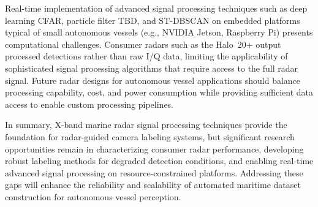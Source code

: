 Real-time implementation of advanced signal processing techniques such as deep learning CFAR, particle filter TBD, and ST-DBSCAN on embedded platforms typical of small autonomous vessels (e.g., NVIDIA Jetson, Raspberry Pi) presents computational challenges. Consumer radars such as the Halo~20+ output processed detections rather than raw I/Q data, limiting the applicability of sophisticated signal processing algorithms that require access to the full radar signal. Future radar designs for autonomous vessel applications should balance processing capability, cost, and power consumption while providing sufficient data access to enable custom processing pipelines.

In summary, X-band marine radar signal processing techniques provide the foundation for radar-guided camera labeling systems, but significant research opportunities remain in characterizing consumer radar performance, developing robust labeling methods for degraded detection conditions, and enabling real-time advanced signal processing on resource-constrained platforms. Addressing these gaps will enhance the reliability and scalability of automated maritime dataset construction for autonomous vessel perception.
